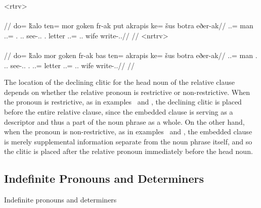 	\a<rtrv>\begingl
		\glpreamble{}\\
		\\
		//
		\gla do= ǩalo ten= mor goken fr-ak put akrapis ke= šus botra eðer-ak//
		\glb \An.\Sg.\Erg= man \In.\Pl.\Acc= \Fps.\Abs{} \In.\Pl.\Dat{} see-\Ind.\Pst.\Pfv{} \Rel.\Rtrv{} letter \An.\Sg.\Dat= \Tps.\An.\Gen{} wife write-\Ind.\Pst.\Pfv//
		\glft{}//
	\endgl
	\a<nrtrv>\begingl
		\glpreamble{}\\
		\\
		//
		\gla do= ǩalo mor goken fr-ak bas ten= akrapis ke= šus botra eðer-ak//
		\glb \An.\Sg.\Erg= man \Fps.\Abs{} \In.\Pl.\Dat{} see-\Ind.\Pst.\Pfv{} \Rel.\Nrtrv{} \In.\Pl.\Acc= letter \An.\Sg.\Dat= \Tps.\An.\Gen{} wife write-\Ind.\Pst.\Pfv//
		\glft{}//
	\endgl
\xe

The location of the declining clitic for the head noun of the relative clause depends on whether the relative pronoun is restrictive or non-restrictive. When the pronoun is restrictive, as in examples~ and , the declining clitic is placed before the entire relative clause, since the embedded clause is serving as a descriptor and thus a part of the noun phrase as a whole. On the other hand, when the pronoun is non-restrictive, as in examples~ and , the embedded clause is merely supplemental information separate from the noun phrase itself, and so the clitic is placed after the relative pronoun immediately before the head noun.

\subsection{Indefinite Pronouns and Determiners}
\label{subsec:tvk-indefinite-pronouns-determiners}

Indefinite pronouns and determiners

